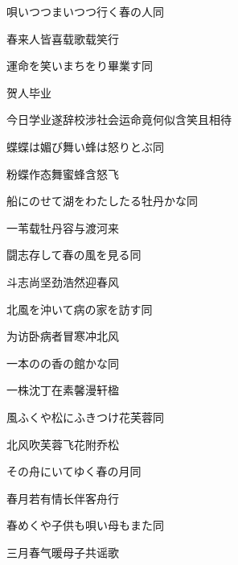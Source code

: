 \begin{haiku}
    {\FH 唄いつつまいつつ行く春の人}\hfill{\FH 同}

    {\FK 春来人皆喜载歌载笑行}
\end{haiku}

\begin{haiku}
    {\FH 運命を笑いまちをり畢業す}\hfill{\FH 同}

    {\FK 贺人毕业}

    {\FK 今日学业遂辞校涉社会运命竟何似含笑且相待}
\end{haiku}

\begin{haiku}
    {\FH 蝶蝶は媚び舞い蜂は怒りとぶ}\hfill{\FH 同}

    {\FK 粉蝶作态舞蜜蜂含怒飞}
\end{haiku}

\begin{haiku}
    {\FH 船にのせて湖をわたしたる牡丹かな}\hfill{\FH 同}

    {\FK 一苇载牡丹容与渡河来}
\end{haiku}

\begin{haiku}
    {\FH 闘志存して春の風を見る}\hfill{\FH 同}

    {\FK 斗志尚坚劲浩然迎春风}
\end{haiku}

\begin{haiku}
    {\FH 北風を沖いて病の家を訪す}\hfill{\FH 同}

    {\FK 为访卧病者冒寒冲北风}
\end{haiku}

\begin{haiku}
    {\FH 一本のの香の館かな}\hfill{\FH 同}

    {\FK 一株沈丁在素馨漫轩楹}
\end{haiku}

\begin{haiku}
    {\FH 風ふくや松にふきつけ花芙蓉}\hfill{\FH 同}

    {\FK 北风吹芙蓉飞花附乔松}
\end{haiku}

\begin{haiku}
    {\FH その舟にいてゆく春の月}\hfill{\FH 同}

    {\FK 春月若有情长伴客舟行}
\end{haiku}

\begin{haiku}
    {\FH 春めくや子供も唄い母もまた}\hfill{\FH 同}

    {\FK 三月春气暖母子共谣歌}
\end{haiku}

